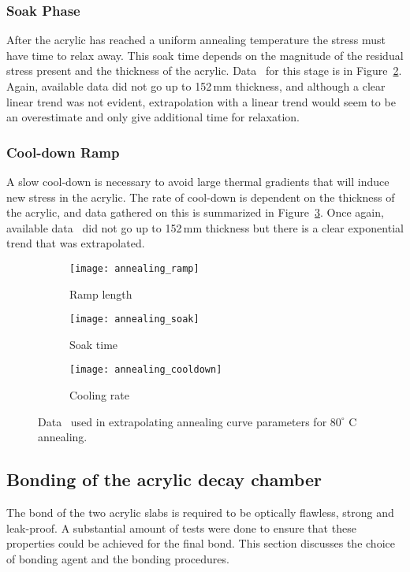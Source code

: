 \subsubsection{Soak Phase}
After the acrylic has reached a uniform annealing temperature the stress must have time to relax away. This soak time depends on the magnitude of the residual stress present and the thickness of the acrylic. Data~\cite{anneal} for this stage is in Figure~\ref{fig:soak}. Again, available data did not go up to 152\,mm thickness, and although a clear linear trend was not evident, extrapolation with a linear trend would seem to be an overestimate and only give additional time for relaxation.

\subsubsection{Cool-down Ramp}
A slow cool-down is necessary to avoid large thermal gradients that will induce new stress in the acrylic. The rate of cool-down is dependent on the thickness of the acrylic, and data gathered on this is summarized in Figure~\ref{fig:cooldown}.  Once again, available data~\cite{anneal} did not go up to 152\,mm thickness but there is a clear exponential trend that was extrapolated.

\begin{figure}
\begin{subfigure}{.32\textwidth}
  \texttt{[image: annealing\_ramp]}
  \caption{Ramp length}
  \label{fig:ramp}
\end{subfigure}
\begin{subfigure}{.32\textwidth}
  \texttt{[image: annealing\_soak]}
  \caption{Soak time}
  \label{fig:soak}
\end{subfigure}
\begin{subfigure}{.32\textwidth}
  \texttt{[image: annealing\_cooldown]}
  \caption{Cooling rate}
  \label{fig:cooldown}
\end{subfigure}
\caption{Data~\cite{anneal} used in extrapolating annealing curve parameters for $80^{\circ}$ C annealing.}
\label{fig:annealdata}
\end{figure}

\subsection{Bonding of the acrylic decay chamber}
\label{sec:bond}
The bond of the two acrylic slabs is required to be optically flawless, strong and leak-proof. A substantial amount of tests were done to ensure that these properties could be achieved for the final bond. This section discusses the choice of bonding agent and the bonding procedures.
